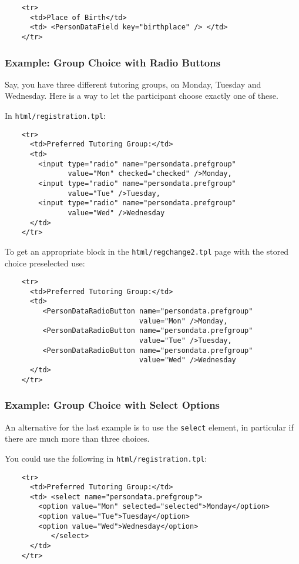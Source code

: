 \documentclass[12pt,openany,a4paper]{book}
\begin{document}
\begin{verbatim}
    <tr>
      <td>Place of Birth</td>
      <td> <PersonDataField key="birthplace" /> </td>
    </tr>
\end{verbatim}

\subsubsection*{Example: Group Choice with Radio Buttons}

Say, you have three different tutoring groups, on Monday, Tuesday and
Wednesday. Here is a way to let the participant choose exactly one of these.

In \texttt{html/registration.tpl}:

\begin{verbatim}
    <tr>
      <td>Preferred Tutoring Group:</td>
      <td>
        <input type="radio" name="persondata.prefgroup" 
               value="Mon" checked="checked" />Monday,
        <input type="radio" name="persondata.prefgroup" 
               value="Tue" />Tuesday,
        <input type="radio" name="persondata.prefgroup" 
               value="Wed" />Wednesday
      </td>
    </tr>
\end{verbatim}

To get an appropriate block in the \texttt{html/regchange2.tpl} page with
the stored choice preselected use:

\begin{verbatim}
    <tr>
      <td>Preferred Tutoring Group:</td>
      <td>
         <PersonDataRadioButton name="persondata.prefgroup" 
                                value="Mon" />Monday,
         <PersonDataRadioButton name="persondata.prefgroup" 
                                value="Tue" />Tuesday,
         <PersonDataRadioButton name="persondata.prefgroup" 
                                value="Wed" />Wednesday
      </td>
    </tr>
\end{verbatim}

\subsubsection*{Example: Group Choice with Select Options}

An alternative for the last example is to use the \texttt{select} element,
in particular if there are much more than three choices.

You could use the following in \texttt{html/registration.tpl}:

\begin{verbatim}
    <tr>
      <td>Preferred Tutoring Group:</td>
      <td> <select name="persondata.prefgroup">
        <option value="Mon" selected="selected">Monday</option>
        <option value="Tue">Tuesday</option>
        <option value="Wed">Wednesday</option>
           </select>
      </td>
    </tr>
\end{verbatim}
\end{document}
